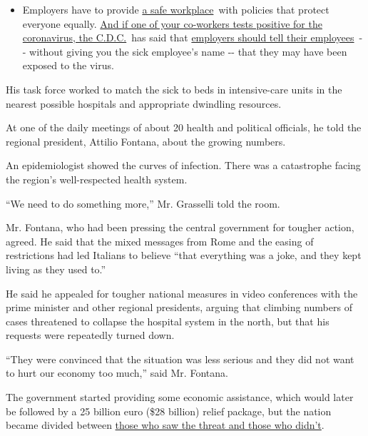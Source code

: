 \begin{itemize}
  \begin{itemize}
  \tightlist
  \item
    Employers have to provide
    \href{https://www.osha.gov/SLTC/covid-19/standards.html}{a safe
    workplace}~with policies that protect everyone equally.
    \href{https://www.nytimes3xbfgragh.onion/article/coronavirus-money-unemployment.html?action=click\&pgtype=Article\&state=default\&region=MAIN_CONTENT_3\&context=storylines_faq}{And
    if one of your co-workers tests positive for the coronavirus, the
    C.D.C.}~has said that
    \href{https://www.cdc.gov/coronavirus/2019-ncov/community/guidance-business-response.html}{employers
    should tell their employees}~-\/- without giving you the sick
    employee's name -\/- that they may have been exposed to the virus.
  \end{itemize}
\end{itemize}

His task force worked to match the sick to beds in intensive-care units
in the nearest possible hospitals and appropriate dwindling resources.

At one of the daily meetings of about 20 health and political officials,
he told the regional president, Attilio Fontana, about the growing
numbers.

An epidemiologist showed the curves of infection. There was a
catastrophe facing the region's well-respected health system.

``We need to do something more,'' Mr. Grasselli told the room.

Mr. Fontana, who had been pressing the central government for tougher
action, agreed. He said that the mixed messages from Rome and the easing
of restrictions had led Italians to believe ``that everything was a
joke, and they kept living as they used to.''

He said he appealed for tougher national measures in video conferences
with the prime minister and other regional presidents, arguing that
climbing numbers of cases threatened to collapse the hospital system in
the north, but that his requests were repeatedly turned down.

``They were convinced that the situation was less serious and they did
not want to hurt our economy too much,'' said Mr. Fontana.

The government started providing some economic assistance, which would
later be followed by a 25 billion euro (\$28 billion) relief package,
but the nation became divided between
\href{https://www.nytimes3xbfgragh.onion/2020/02/28/world/europe/italy-coronavirus-quarantine.html?action=click\&module=RelatedLinks\&pgtype=Article}{those
who saw the threat and those who didn't}.

